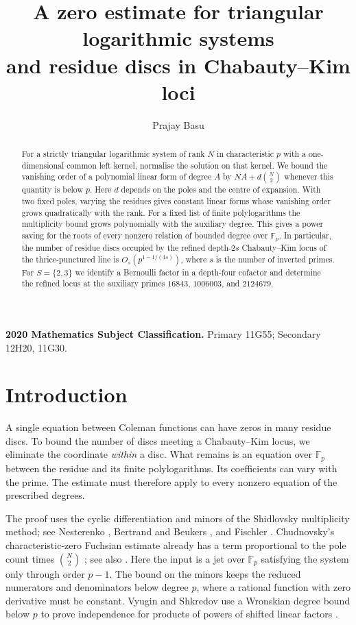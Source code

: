 \documentclass[11pt]{article}
\title{A zero estimate for triangular logarithmic systems\\
and residue discs in Chabauty--Kim loci}
\author{Prajay Basu}
\date{}
\begin{document}
\maketitle
\begin{abstract}
For a strictly triangular logarithmic system of rank \(N\) in characteristic
\(p\) with a one-dimensional common left kernel, normalise the solution
on that kernel. We bound the vanishing order of a polynomial linear form of degree \(A\)
by \(NA+d\binom N2\) whenever this quantity is below \(p\).
Here \(d\) depends on the poles and the centre of expansion.
With two fixed poles, varying the residues gives constant linear forms
whose vanishing order grows quadratically with the rank.
For a fixed list of finite polylogarithms the multiplicity bound grows
polynomially with the auxiliary degree. This gives a power saving for
the roots of every nonzero relation of bounded degree over \(\mathbb F_p\).
In particular, the number of residue discs occupied by the refined depth-\(2s\)
Chabauty--Kim locus of the thrice-punctured line is
\(O_s(p^{1-1/(4s)})\), where \(s\) is the number of inverted primes.
For \(S=\{2,3\}\) we identify a Bernoulli factor in a depth-four cofactor
and determine the refined locus at the auxiliary primes
\(16843\), \(1006003\), and \(2124679\).
\end{abstract}

\noindent\textbf{2020 Mathematics Subject Classification.}
Primary 11G55; Secondary 12H20, 11G30.

\section{Introduction}
A single equation between Coleman functions can have zeros in many residue
discs. To bound the number of discs meeting a Chabauty--Kim locus, we
eliminate the coordinate \emph{within} a disc. What remains is an equation
over \(\mathbb F_p\) between the residue and its finite polylogarithms.
Its coefficients can vary with the prime. The estimate must therefore
apply to every nonzero equation of the prescribed degrees.

The proof uses the cyclic differentiation and minors of the
Shidlovsky multiplicity method; see Nesterenko \cite{Nesterenko},
Bertrand and Beukers \cite{BertrandBeukers}, and Fischler \cite{Fischler}.
Chudnovsky's characteristic-zero Fuchsian estimate already has a term
proportional to the pole count times $\binom N2$
\cite[Corollary~11.3.10]{Chudnovsky}; see also
\cite[Theorem~3.2.10]{CDT}. Here the input is a jet over $\mathbb F_p$
satisfying the system only through order $p-1$. The bound on the minors
keeps the reduced numerators and denominators below degree $p$,
where a rational function with zero derivative must be constant.
Vyugin and Shkredov use a Wronskian degree bound below $p$ to prove
independence for products of powers of shifted linear factors
\cite[Proposition~3.2 and Lemma~3.3]{VyuginShkredov}.
\end{document}
